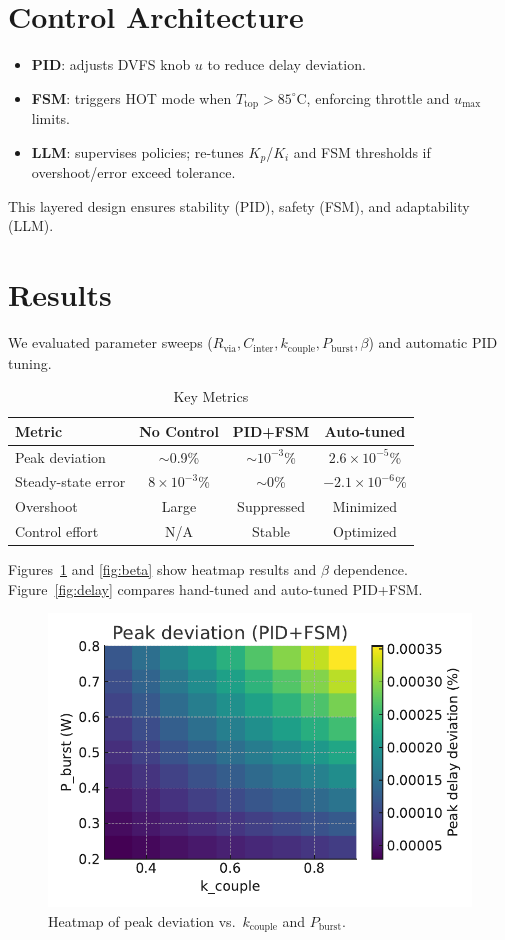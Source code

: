 \documentclass[conference]{IEEEtran}
\begin{document}
\section{Control Architecture}
\begin{itemize}
  \item \textbf{PID}: adjusts DVFS knob $u$ to reduce delay deviation.
  \item \textbf{FSM}: triggers HOT mode when $T_{\text{top}} > 85^\circ$C, enforcing throttle and $u_{\max}$ limits.
  \item \textbf{LLM}: supervises policies; re-tunes $K_p$/$K_i$ and FSM thresholds if overshoot/error exceed tolerance.
\end{itemize}
This layered design ensures stability (PID), safety (FSM), and adaptability (LLM).

\section{Results}
We evaluated parameter sweeps ($R_{\mathrm{via}}, C_{\mathrm{inter}}, k_{\mathrm{couple}}, P_{\mathrm{burst}}, \beta$)
and automatic PID tuning.

\begin{table}[htbp]
\centering
\caption{Key Metrics}
\begin{tabular}{|l|c|c|c|}
\hline
Metric & No Control & PID+FSM & Auto-tuned \\
\hline
Peak deviation & $\sim$0.9\% & $\sim$$10^{-3}$\% & $2.6\times 10^{-5}$\% \\
Steady-state error & $8\times 10^{-3}$\% & $\sim$0\% & $-2.1\times 10^{-6}$\% \\
Overshoot & Large & Suppressed & Minimized \\
Control effort & N/A & Stable & Optimized \\
\hline
\end{tabular}
\end{table}

Figures~\ref{fig:heatmap} and \ref{fig:beta} show heatmap results
and $\beta$ dependence. Figure~\ref{fig:delay} compares hand-tuned and auto-tuned PID+FSM.

\begin{figure}[htbp]
\centering
\includegraphics[width=0.9\columnwidth]{figs/heatmap.pdf}
\caption{Heatmap of peak deviation vs.\ $k_{\mathrm{couple}}$ and $P_{\mathrm{burst}}$.}
\label{fig:heatmap}
\end{figure}
\end{document}

